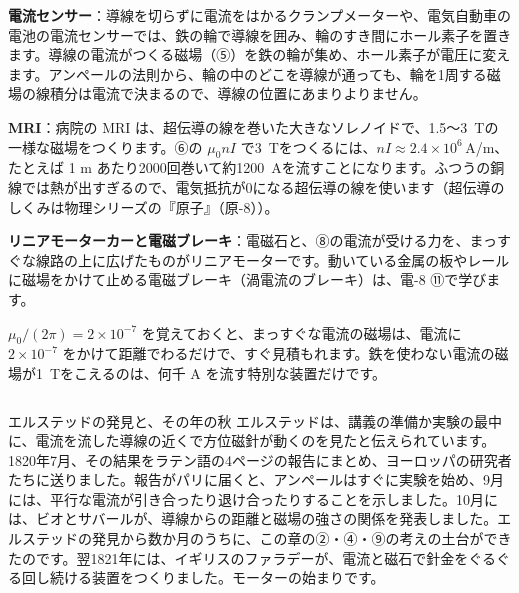 \begin{phkougaku}
\textbf{電流センサー}：導線を切らずに電流をはかるクランプメーターや、電気自動車の電池の電流センサーでは、鉄の輪で導線を囲み、輪のすき間にホール素子を置きます。導線の電流がつくる磁場（⑤）を鉄の輪が集め、ホール素子が電圧に変えます。アンペールの法則から、輪の中のどこを導線が通っても、輪を1周する磁場の線積分は電流で決まるので、導線の位置にあまりよりません。

\textbf{MRI}：病院の MRI は、超伝導の線を巻いた大きなソレノイドで、1.5〜\qty{3}{T}の一様な磁場をつくります。⑥の $\mu_0nI$ で\qty{3}{T}をつくるには、$nI\approx2.4\times10^6$\,A/m、たとえば 1 m あたり2000回巻いて約\qty{1200}{A}を流すことになります。ふつうの銅線では熱が出すぎるので、電気抵抗が0になる超伝導の線を使います（超伝導のしくみは物理シリーズの『原子』（原-8））。

\textbf{リニアモーターカーと電磁ブレーキ}：電磁石と、⑧の電流が受ける力を、まっすぐな線路の上に広げたものがリニアモーターです。動いている金属の板やレールに磁場をかけて止める電磁ブレーキ（渦電流のブレーキ）は、電-8 ⑪で学びます。

\begin{phketa}
$\mu_0/(2\pi)=2\times10^{-7}$ を覚えておくと、まっすぐな電流の磁場は、電流に $2\times10^{-7}$ をかけて距離でわるだけで、すぐ見積もれます。鉄を使わない電流の磁場が\qty{1}{T}をこえるのは、何千 A を流す特別な装置だけです。
\end{phketa}
\end{phkougaku}

\begin{column}{エルステッドの発見と、その年の秋}
エルステッドは、講義の準備か実験の最中に、電流を流した導線の近くで方位磁針が動くのを見たと伝えられています。1820年7月、その結果をラテン語の4ページの報告にまとめ、ヨーロッパの研究者たちに送りました。報告がパリに届くと、アンペールはすぐに実験を始め、9月には、平行な電流が引き合ったり退け合ったりすることを示しました。10月には、ビオとサバールが、導線からの距離と磁場の強さの関係を発表しました。エルステッドの発見から数か月のうちに、この章の②・④・⑨の考えの土台ができたのです。翌1821年には、イギリスのファラデーが、電流と磁石で針金をぐるぐる回し続ける装置をつくりました。モーターの始まりです。
\end{column}

